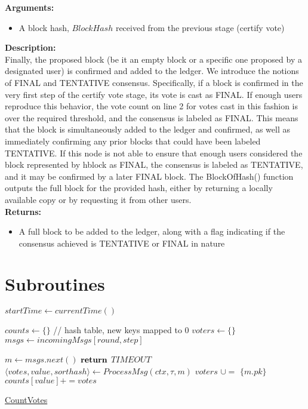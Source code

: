 \documentclass[10pt,a4paper]{article}
\begin{document}
\noindent \textbf{Arguments:}
\begin{itemize}
    \item A block hash, $BlockHash$ received from the previous stage (certify vote)
  \end{itemize}

\noindent \textbf{Description:}\\
Finally, the proposed block (be it an empty block or a specific one 
proposed by a designated user) is confirmed and added to the ledger.
We introduce the notions of FINAL and TENTATIVE consensus.
Specifically, if a block is confirmed in the very first step of the 
certify vote stage, its vote is cast as FINAL.
If enough users reproduce this behavior, the vote count on line 2 for 
votes cast in this fashion is over the required threshold, and the 
consensus is labeled as FINAL.
This means that the block is simultaneously added to the ledger and 
confirmed, as well as immediately confirming any prior blocks that 
could have been labeled TENTATIVE.
If this node is not able to ensure that enough users considered the 
block represented by hblock as FINAL, the consensus is labeled as 
TENTATIVE, and it may be confirmed by a later FINAL block.
The BlockOfHash() function outputs the full block for the provided 
hash, either by returning a locally available copy or by requesting 
it from other users.\\

\noindent \textbf{Returns:}
\begin{itemize}
    \item A full block to be added to the ledger, along with a flag indicating if
    the consensus achieved is TENTATIVE or FINAL in nature
  \end{itemize}

\section{Subroutines}

\begin{algorithm}[H]
    \begin{algorithmic}[H]

    \State $startTime \gets currentTime()$

    \State $counts \gets \{\}$ // hash table, new keys mapped to 0
    \State $voters \gets \{\}$
    \State $msgs \gets incomingMsgs[round,step]$

        \State $m \gets msgs.next()$
                \State $\Return$ $TIMEOUT$
            \EndIf
        \Else
            \State $ \langle votes, value, sorthash \rangle \gets ProcessMsg(ctx, \tau, m)$
            \State $voters$ $\cup=$ $\{m.pk\}$
            \State $counts[value] += votes$
        \EndIf
    \EndWhile
    \EndFunction
    \end{algorithmic}
    \caption{\underline{CountVotes}}
\end{algorithm}
\end{document}
